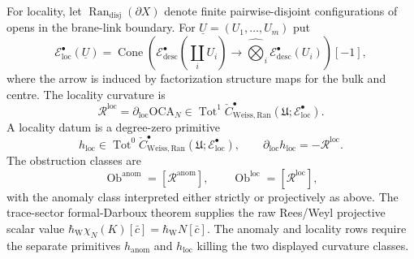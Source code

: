 \begin{defn}
For locality, let \(\operatorname{Ran}_{\mathrm{disj}}(\partial X)\)
denote finite pairwise-disjoint configurations of opens in the
brane-link boundary.  For
\(\underline U=(U_1,\ldots,U_m)\) put
\[
  \mathcal E^\bullet_{\mathrm{loc}}(\underline U)
  =
  \operatorname{Cone}\!\left(
  \mathcal E^\bullet_{\mathrm{desc}}(\textstyle\coprod_iU_i)
  \longrightarrow
  \widehat\bigotimes_i
  \mathcal E^\bullet_{\mathrm{desc}}(U_i)
  \right)[-1],
\]
where the arrow is induced by factorization structure maps for the bulk
and centre.  The locality curvature is
\[
  \mathcal R^{\mathrm{loc}}
  =
  \partial_{\mathrm{loc}}\mathrm{OCA}_N
  \in
  \operatorname{Tot}^1\check C^\bullet_{\mathrm{Weiss,Ran}}
  (\mathfrak U;\mathcal E^\bullet_{\mathrm{loc}}).
\]
A locality datum is a degree-zero primitive
\[
  h_{\mathrm{loc}}\in
  \operatorname{Tot}^0\check C^\bullet_{\mathrm{Weiss,Ran}}
  (\mathfrak U;\mathcal E^\bullet_{\mathrm{loc}}),
  \qquad
  \partial_{\mathrm{loc}}h_{\mathrm{loc}}
  =-\mathcal R^{\mathrm{loc}}.
\]
The obstruction classes are
\[
  \operatorname{Ob}^{\mathrm{anom}}
  =
  [\mathcal R^{\mathrm{anom}}],
  \qquad
  \operatorname{Ob}^{\mathrm{loc}}
  =
  [\mathcal R^{\mathrm{loc}}],
\]
with the anomaly class interpreted either strictly or projectively as
above.  The trace-sector formal-Darboux theorem supplies the raw
Rees/Weyl projective scalar value
\(\hbar_{\mathrm{W}}\chi_N(K)[\bar c]
=\hbar_{\mathrm{W}}N[\bar c]\).  The anomaly and locality
rows require the separate primitives \(h_{\mathrm{anom}}\) and
\(h_{\mathrm{loc}}\) killing the two displayed curvature classes.
\end{defn}

